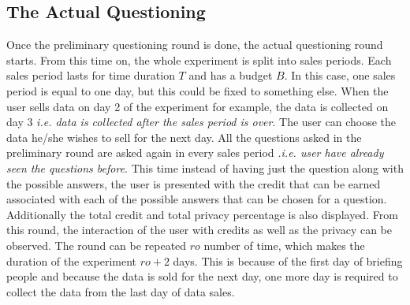 \subsection{The Actual Questioning}
Once the preliminary questioning round is done, the actual questioning round starts. From this time on, the whole experiment is
split into sales periods. Each sales period lasts for time duration $T$ and has a budget $B$. In this case, one sales period
is equal to one day, but this could be fixed to something else. When the user sells data on day 2 of the experiment for example, the data is collected on day 3 {\it i.e. data is collected after the sales period is over}.
 The user can choose the data he/she
wishes to sell for the next day. All the questions asked in the preliminary round are asked again in every sales period {\it .i.e. user have already seen the questions before}. 
This time instead of having just the question along with the possible answers, the user is presented with
the credit that can be earned associated with each of the possible answers that can be chosen for a question. Additionally the total credit and total privacy percentage is also displayed. From this round,
the interaction of the user with credits as well as the privacy can be observed. The round can be repeated $ro$ number of time, which makes the duration of the experiment
$ro + 2$ days. This is because of the first day of briefing people and because the data is sold for the next day, one more day is required to collect the data from
the last day of data sales.

